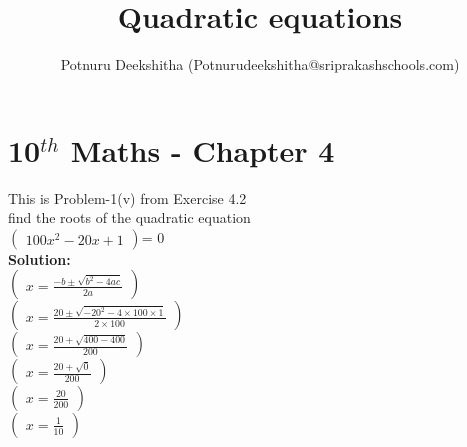 \documentclass[12pt]{article}
\title{Quadratic equations}
\author{Potnuru Deekshitha (Potnurudeekshitha@sriprakashschools.com)}
\newcommand{\myvec}[1]{\ensuremath{\begin{pmatrix}#1\end{pmatrix}}}
\newcommand{\solution}{\noindent \textbf{Solution: }}
\begin{document}
\section*{10$^{th}$ Maths - Chapter 4}
This is Problem-1(v) from Exercise 4.2\\
find the roots of the quadratic equation\\
\myvec{{100}x^2-{20} x +{1} }= 0\\

\solution\\
\myvec{x=\frac{-b\pm\sqrt{b^2-4ac}}{2a}}\\
\myvec{x=\frac{20\pm\sqrt{-20^2-4 \times 100\times1}}{2 \times 100}}\\
\myvec{x=\frac{20+\sqrt{400-400}}{200}}\\
\myvec{x=\frac{20+\sqrt{0}}{200}}\\
\myvec{x=\frac{20}{200}}\\
\myvec{x=\frac{1}{10}}\\
\end{document}
